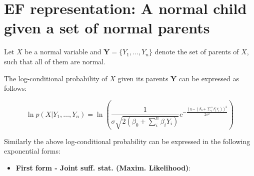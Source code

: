 \documentclass[11pt, oneside]{article}   	%
\newcommand{\me}{\mathrm{e}}
\numberwithin{figure}{section}
\numberwithin{equation}{section}
\numberwithin{table}{section}
\theoremstyle{definition}
\begin{document}
\begin{appendices}
\begin{itemize}
\end{itemize}


\newpage
\section{EF representation: A normal child given a set of normal parents}

Let $X$ be a normal variable and $ \mathbf{Y} = \{Y_1,\ldots,Y_n\}$ denote the set of parents of $X$, such that all of them are normal. 

The log-conditional probability of $X$ given its parents $\mathbf{Y}$ can be expressed as follows:

$$ \ln p(X|Y_1,\ldots,Y_n) = \ln \left(\frac{1}{\sigma \sqrt{2(\beta_0+\sum_i^n \beta_i Y_i )}} \me^{-\frac{(y-(\beta_0+\sum_i^n \beta_i Y_i))^2}{2\sigma^2}} \right)$$


Similarly the above log-conditional probability can be expressed in the following exponential forms:

\begin{itemize}
\item \textbf{First form - Joint suff. stat. (Maxim. Likelihood)}:


\end{itemize}
\end{appendices}
\end{document}
